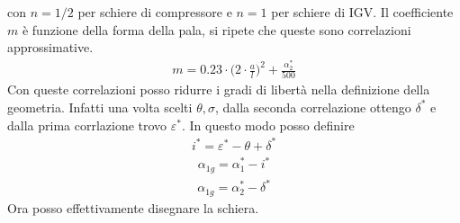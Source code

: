 con $n = 1/2$ per schiere di compressore e $n = 1$ per schiere di IGV. Il coefficiente $m$ è funzione della forma della pala, si ripete che queste sono correlazioni approssimative.
\begin{align*}
m = 0.23 \cdot \bigg( 2 \cdot \frac{a}{l} \bigg)^2 + \frac{\alpha_2^*}{500}
\end{align*}
Con queste correlazioni posso ridurre i gradi di libertà nella definizione della geometria. Infatti una volta scelti $ \theta, \sigma $, dalla seconda correlazione ottengo $ \delta^* $ e dalla prima corrlazione trovo $ \varepsilon^* $. In questo modo posso definire
\begin{align*}
i^* = \varepsilon^* - \theta + \delta^*
\end{align*}
\begin{align*}
\alpha_{1g} = \alpha_1^* - i^*
\end{align*}
\begin{align*}
\alpha_{1g} = \alpha_2^* - \delta^*
\end{align*}
Ora posso effettivamente disegnare la schiera. 

